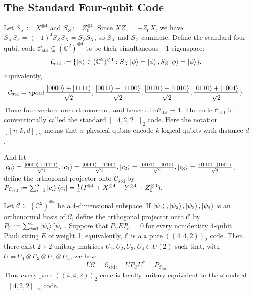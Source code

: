 \subsection{The Standard Four-qubit Code}

\begin{definition}
    Let $S_X:=X^{\otimes 4}$ and $S_Z:=Z_0^{\otimes 4}$. Since $XZ_0=-Z_0X$, we have $S_XS_Z=(-1)^4S_ZS_X=S_ZS_X$, so $S_X$ and $S_Z$ commute. Define the standard four-qubit code $\mathcal{C}_{\mathrm{std}}\subseteq (\mathbb{C}^2)^{\otimes 4}$ to be their simultaneous $+1$ eigenspace:
    \begin{equation}
        \mathcal{C}_{\mathrm{std}}:=\{\ket{\phi}\in (\mathbb{C}^2)^{\otimes 4}:S_X\ket{\phi}=\ket{\phi},S_Z\ket{\phi}=\ket{\phi}\}.
    \end{equation}
    Equivalently, $$\mathcal{C}_{\mathrm{std}}=\operatorname{span}\{\frac{\ket{0000}+\ket{1111}}{\sqrt 2},\frac{\ket{0011}+\ket{1100}}{\sqrt 2},\frac{\ket{0101}+\ket{1010}}{\sqrt 2},\frac{\ket{0110}+\ket{1001}}{\sqrt 2}\}.$$
    These four vectors are orthonormal, and hence $\mathrm{dim} \mathcal{C}_{\mathrm{std}}=4$. The code $\mathcal{C}_{\mathrm{std}}$ is conventionally called the standard $[[4,2,2]]_2$ code. Here the notation $[[n,k,d]]_2$ means that $n$ physical qubits encode $k$ logical qubits with distance $d$.

    And let $\ket{c_0}=\frac{\ket{0000}+\ket{1111}}{\sqrt 2},\ket{c_1}=\frac{\ket{0011}+\ket{1100}}{\sqrt 2},\ket{c_2}=\frac{\ket{0101}+\ket{1010}}{\sqrt 2},\ket{c_3}=\frac{\ket{0110}+\ket{1001}}{\sqrt 2}$, define the orthogonal projector onto $\mathcal{C}_{\mathrm{std}}$ by $P_{\mathcal{C}_{\mathrm{std}}}:=\sum_{i=0}^3\ket{c_i}\bra{c_i}=\frac{1}{4}(I^{\otimes 4}+X^{\otimes 4}+Y^{\otimes 4}+Z_0^{\otimes 4}).$
\end{definition}

\begin{theorem}\label{thm: rains standard code}
    Let $\mathcal{C}\subseteq (\mathbb{C}^2)^{\otimes 4}$ be a 4-dimensional subspace. If $\ket{\psi_1},\ket{\psi_2},\ket{\psi_3},\ket{\psi_4}$ is an orthonormal basis of $\mathcal{C}$, define the orthogonal projector onto $\mathcal{C}$ by $P_{\mathcal{C}}:=\sum_{i=1}^4\ket{\psi_i}\bra{\psi_i}$. Suppose that $P_{\mathcal{C}}EP_{\mathcal{C}}=0$ for every nonidentity 4-qubit Pauli string $E$ of weight 1; equivalently, $\mathcal{C}$ is a a pure $((4,4,2))_2$ code. Then there exist $2\times 2$ unitary matrices $U_1,U_2,U_3,U_4\in U(2)$ such that, with $U=U_1\otimes U_2\otimes U_3\otimes U_4$, we have
    \begin{equation}
        U\mathcal{C}=\mathcal{C}_{\mathrm{std}},\quad UP_{\mathcal{C}}U^\dagger=P_{\mathcal{C}_{\mathrm{std}}}
    \end{equation}
    Thus every pure $((4,4,2))_2$ code is locally unitary equivalent to the standard $[[4,2,2]]_2$ code.
\end{theorem}

